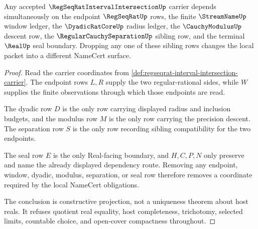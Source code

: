 \begin{theorem}
\label{thm:regseqrat-interval-intersection-sibling-dependency}
Any accepted $\RegSeqRatIntervalIntersectionUp$ carrier depends simultaneously on the endpoint $\RegSeqRatUp$ rows, the finite $\StreamNameUp$ window ledger, the $\DyadicRatCoreUp$ radius ledger, the $\CauchyModulusUp$ descent row, the $\RegularCauchySeparationUp$ sibling row, and the terminal $\RealUp$ seal boundary. Dropping any one of these sibling rows changes the local packet into a different NameCert surface.
\end{theorem}
\begin{proof}
Read the carrier coordinates from \autoref{def:regseqrat-interval-intersection-carrier}. The endpoint rows $L,R$ supply the two regular-rational sides, while $W$ supplies the finite observations through which those endpoints are read.

The dyadic row $D$ is the only row carrying displayed radius and inclusion budgets, and the modulus row $M$ is the only row carrying the precision descent. The separation row $S$ is the only row recording sibling compatibility for the two endpoints.

The seal row $E$ is the only Real-facing boundary, and $H,C,P,N$ only preserve and name the already displayed dependency route. Removing any endpoint, window, dyadic, modulus, separation, or seal row therefore removes a coordinate required by the local NameCert obligations.

The conclusion is constructive projection, not a uniqueness theorem about host reals. It refuses quotient real equality, host completeness, trichotomy, selected limits, countable choice, and open-cover compactness throughout.
\end{proof}



